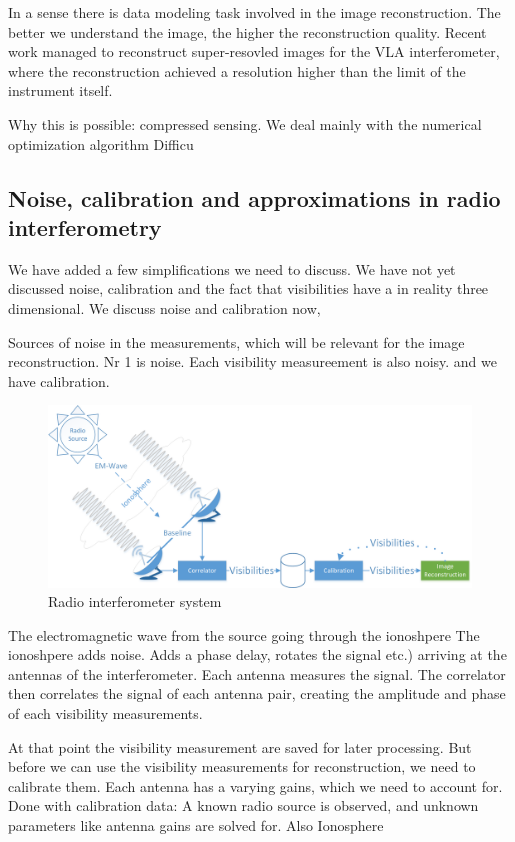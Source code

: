 In a sense there is data modeling task involved in the image reconstruction. The better we understand the image, the higher the reconstruction quality. Recent work managed to reconstruct super-resovled images for the VLA interferometer\cite{dabbech2018cygnus}, where the reconstruction achieved a resolution higher than the limit of the instrument itself.

Why this is possible: compressed sensing\cite{candes2006robust,donoho2006compressed}. 
We deal mainly with the numerical optimization algorithm
Difficu


\subsection{Noise, calibration and approximations in radio interferometry}
We have added a few simplifications we need to discuss. We have not yet discussed noise, calibration and the fact that visibilities have a in reality three dimensional.
We discuss noise and calibration now, 

Sources of noise in the measurements, which will be relevant for the image reconstruction.
 Nr 1 is noise. Each visibility measureement is also noisy. and we have calibration.

\begin{figure}[h]
	\centering
	\includegraphics[width=0.80\linewidth]{./chapters/01.intro/system.png}
	\caption{Radio interferometer system}
	\label{intro:system}
\end{figure}

The electromagnetic wave from the source going through the ionoshpere
The ionoshpere adds noise. Adds a phase delay, rotates the signal etc.)
arriving at the antennas of the interferometer.
Each antenna measures the signal. The correlator then correlates the signal of each antenna pair, creating the amplitude and phase of each visibility measurements.

At that point the visibility measurement are saved for later processing. But before we can use the visibility measurements for reconstruction, we need to calibrate them. Each antenna has a varying gains, which we need to account for.
Done with calibration data: A known radio source is observed, and unknown parameters like antenna gains are solved for. 
Also Ionosphere

